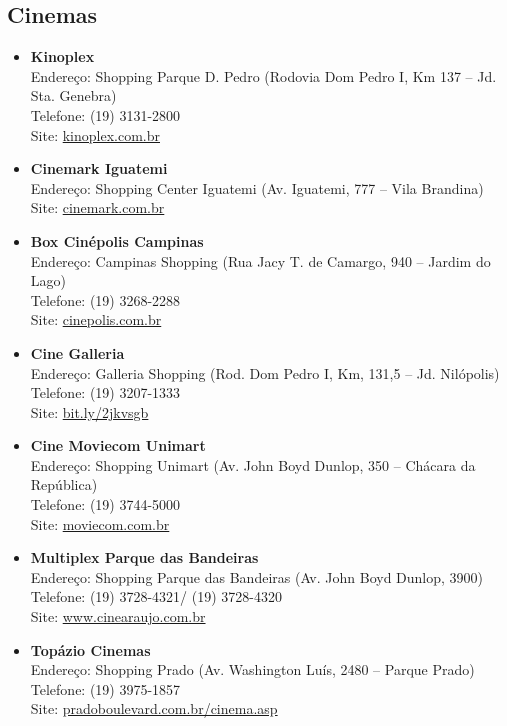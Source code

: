 \subsection{Cinemas}

\begin{itemize}
\item \textbf{Kinoplex}
  \\Endereço: Shopping Parque D. Pedro (Rodovia Dom Pedro I, Km 137 -- Jd. Sta.
  Genebra)
  \\Telefone: (19) 3131-2800
  \\Site: \url{kinoplex.com.br}

\item \textbf{Cinemark Iguatemi}
  \\Endereço: Shopping Center Iguatemi (Av. Iguatemi, 777 -- Vila Brandina)
  \\Site: \url{cinemark.com.br}

\item \textbf{Box Cinépolis Campinas}
  \\Endereço: Campinas Shopping (Rua Jacy T. de Camargo, 940 -- Jardim do Lago)
  \\Telefone: (19) 3268-2288
  \\Site: \url{cinepolis.com.br}

\item \textbf{Cine Galleria}
  \\Endereço: Galleria Shopping (Rod. Dom Pedro I, Km, 131,5 -- Jd. Nilópolis)
  \\Telefone: (19) 3207-1333
  \\Site: \url{bit.ly/2jkvsgb}

\item \textbf{Cine Moviecom Unimart}
  \\Endereço: Shopping Unimart (Av. John Boyd Dunlop, 350 -- Chácara da
  República)
  \\Telefone: (19) 3744-5000
  \\Site: \url{moviecom.com.br}

\item \textbf{Multiplex Parque das Bandeiras}
  \\Endereço: Shopping Parque das Bandeiras (Av. John Boyd Dunlop, 3900)
  \\Telefone: (19) 3728-4321/ (19) 3728-4320
  \\Site: \url{www.cinearaujo.com.br}

\item \textbf{Topázio Cinemas}
  \\Endereço: Shopping Prado (Av. Washington Luís, 2480 -- Parque Prado)
  \\Telefone: (19) 3975-1857
  \\Site: \url{pradoboulevard.com.br/cinema.asp}
\end{itemize}

